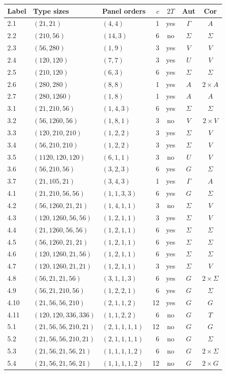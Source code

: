 \begin{longtable}{@{}l l l r c c c@{}}
\toprule Label & Type sizes & Panel orders & $c$ & $2T$ & Aut & Cor\\\midrule\endhead
2.1&$(21,21)$&$(4,4)$&1&yes&$\Gamma$&$A$\\
2.2&$(210,56)$&$(14,3)$&6&no&$\Sigma$&$\Sigma$\\
2.3&$(56,280)$&$(1,9)$&3&yes&$V$&$V$\\
2.4&$(120,120)$&$(7,7)$&3&yes&$U$&$V$\\
2.5&$(210,120)$&$(6,3)$&6&yes&$\Sigma$&$\Sigma$\\
2.6&$(280,280)$&$(8,8)$&1&yes&$A$&$2\times A$\\
2.7&$(280,1260)$&$(1,8)$&1&yes&$A$&$A$\\
3.1&$(21,210,56)$&$(1,4,3)$&6&yes&$\Sigma$&$\Sigma$\\
3.2&$(56,1260,56)$&$(1,8,1)$&3&no&$V$&$2\times V$\\
3.3&$(120,210,210)$&$(1,2,2)$&3&yes&$\Sigma$&$V$\\
3.4&$(56,210,210)$&$(1,2,2)$&3&yes&$\Sigma$&$V$\\
3.5&$(1120,120,120)$&$(6,1,1)$&3&no&$U$&$V$\\
3.6&$(56,210,56)$&$(3,2,3)$&6&yes&$G$&$\Sigma$\\
3.7&$(21,105,21)$&$(3,4,3)$&1&yes&$\Gamma$&$A$\\
4.1&$(21,210,56,56)$&$(1,1,3,3)$&6&yes&$G$&$\Sigma$\\
4.2&$(56,1260,21,21)$&$(1,4,1,1)$&3&no&$\Sigma$&$V$\\
4.3&$(120,1260,56,56)$&$(1,2,1,1)$&3&yes&$\Sigma$&$V$\\
4.4&$(21,1260,56,56)$&$(1,2,1,1)$&6&yes&$\Sigma$&$\Sigma$\\
4.5&$(56,1260,21,21)$&$(1,2,1,1)$&6&yes&$\Sigma$&$\Sigma$\\
4.6&$(120,1260,21,56)$&$(1,2,1,1)$&6&yes&$\Sigma$&$\Sigma$\\
4.7&$(120,1260,21,21)$&$(1,2,1,1)$&3&yes&$\Sigma$&$V$\\
4.8&$(56,21,21,56)$&$(3,1,1,3)$&6&yes&$G$&$2\times\Sigma$\\
4.9&$(56,21,210,56)$&$(1,2,2,1)$&6&yes&$G$&$\Sigma$\\
4.10&$(21,56,56,210)$&$(2,1,1,2)$&12&yes&$G$&$G$\\
4.11&$(120,120,336,336)$&$(1,1,2,2)$&6&no&$G$&$T$\\
5.1&$(21,56,56,210,21)$&$(2,1,1,1,1)$&12&no&$G$&$G$\\
5.2&$(21,56,56,210,21)$&$(2,1,1,1,1)$&6&no&$G$&$\Sigma$\\
5.3&$(21,56,21,56,21)$&$(1,1,1,1,2)$&6&no&$G$&$2\times\Sigma$\\
5.4&$(21,56,21,56,21)$&$(1,1,1,1,2)$&12&no&$G$&$2\times G$\\
\bottomrule\end{longtable}
